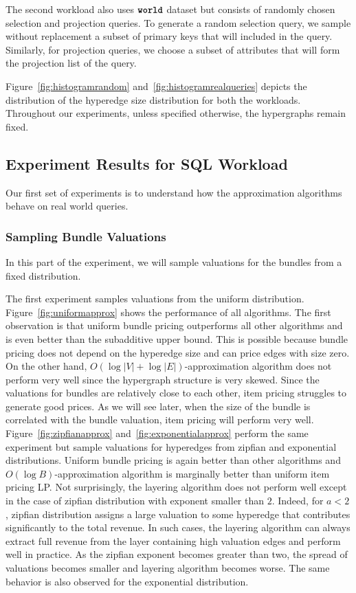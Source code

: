 The second workload also uses $\texttt{\bfseries world}$ dataset but consists of randomly chosen selection and projection queries. To generate a random selection query, we  sample without replacement a subset of primary keys that will included in the query. Similarly, for projection queries, we choose a subset of attributes that will form the projection list of the query.

Figure~\ref{fig:histogramrandom} and~\ref{fig:histogramrealqueries} depicts the distribution of the hyperedge size distribution for both the workloads. Throughout our experiments, unless specified otherwise, the hypergraphs remain fixed.


\subsection{Experiment Results for SQL Workload}

Our first set of experiments is to understand how the approximation algorithms behave on real world queries. 




\subsubsection{Sampling Bundle Valuations} 
In this part of the experiment, we will sample valuations for the bundles from a fixed distribution.

\smallskip
{} The first experiment samples valuations from the uniform distribution. Figure~\ref{fig:uniformapprox} shows the performance of all algorithms. The first observation is that uniform bundle pricing outperforms all other algorithms and is even better than the subadditive upper bound. This is possible because bundle pricing does not depend on the hyperedge size and can price edges with size zero. On the other hand, $O(\log |V|+\log |E|)$-approximation algorithm does not perform very well since the hypergraph structure is very skewed. Since the valuations for bundles are relatively close to each other, item pricing struggles to generate good prices. As we will see later, when the size of the bundle is correlated with the bundle valuation, item pricing will perform very well.  Figure~\ref{fig:zipfianapprox} and~\ref{fig:exponentialapprox} perform the same experiment but sample valuations for hyperedges from zipfian and exponential distributions. Uniform bundle pricing is again better than other algorithms and $O(\log B)$-approximation algorithm is marginally better than uniform item pricing LP. Not surprisingly, the layering algorithm does not perform well except in the case of zipfian distribution with exponent smaller than $2$. Indeed, for $a < 2$, zipfian distribution assigns a large valuation to some hyperedge that contributes significantly to the total revenue. In such cases, the layering algorithm can always extract full revenue from the layer containing high valuation edges and perform well in practice. As the zipfian exponent becomes greater than two, the spread of valuations becomes smaller and layering algorithm becomes worse. The same behavior is also observed for the exponential distribution. 



